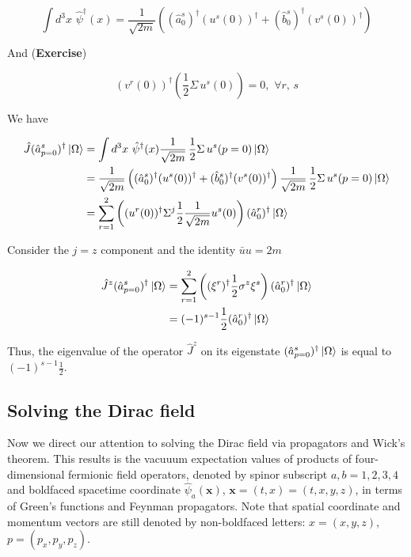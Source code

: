 \begin{equation}
\int d^3 x \,\, \hat{\psi}^\dagger (x) = \frac{1}{\sqrt{2m}} \left( (\hat{a}_0^s)^\dagger (u^s(0))^\dagger + (\hat{b}_0^s)^\dagger (v^s (0))^\dagger \right)
\end{equation}

\noindent And (\textbf{Exercise})

\begin{equation}
(v^r (0))^\dagger (\frac{1}{2} \Sigma \, u^s (0)) = 0, \,\, \forall r, \, s
\end{equation}

\noindent We have

\begin{align}
\hat{J} (\hat{a}_{p=0}^s)^\dagger \ket{\Omega} &= \int d^3 x \,\, \hat{\psi}^\dagger (x) \frac{1}{\sqrt{2 m}} \, \frac{1}{2} \Sigma \, u^s(p=0) \ket{\Omega} \\
&= \frac{1}{\sqrt{2m}} \left( (\hat{a}_0^s)^\dagger (u^s(0))^\dagger + (\hat{b}_0^s)^\dagger (v^s (0))^\dagger \right) \frac{1}{\sqrt{2 m}} \, \frac{1}{2} \Sigma \, u^s(p=0) \ket{\Omega} \\
&= \sum_{r=1}^2 \left( (u^r (0))^\dagger \Sigma^j \frac{1}{2} \frac{1}{\sqrt{2m}} u^s (0) \right) (\hat{a}_0^r)^\dagger \ket{\Omega}
\end{align}

\noindent Consider the $j=z$ component and the identity $\bar{u}u = 2m$

\begin{align}
\hat{J}^z (\hat{a}_{p=0}^s)^\dagger \ket{\Omega} &= \sum_{r=1}^2 \left( (\xi^r)^\dagger \frac{1}{2} \sigma^z \xi^s \right) (\hat{a}_0^r )^\dagger \ket{\Omega} \\
&= (-1)^{s-1} \frac{1}{2} (\hat{a}_0^r )^\dagger \ket{\Omega}
\end{align}

\noindent Thus, the eigenvalue of the operator $\hat{J}^z$ on its eigenstate $(\hat{a}_{p=0}^s)^\dagger \ket{\Omega}$ is equal to  $(-1)^{s-1} \frac{1}{2}$. \\

\subsection*{Solving the Dirac field}

\noindent Now we direct our attention to solving the Dirac field via propagators and Wick's theorem. This results is the vacuuum expectation values of products of four-dimensional fermionic field operators, denoted by spinor subscript $a,b = 1,2,3,4$ and boldfaced spacetime coordinate $\hat{\psi}_a (\textbf{x})$, $\textbf{x} = (t,x) = (t,x,y,z)$, in terms of Green's functions and Feynman propagators. Note that spatial coordinate and momentum vectors are still denoted by non-boldfaced letters: $x = (x,y,z)$, $p=(p_x,p_y,p_z)$.

